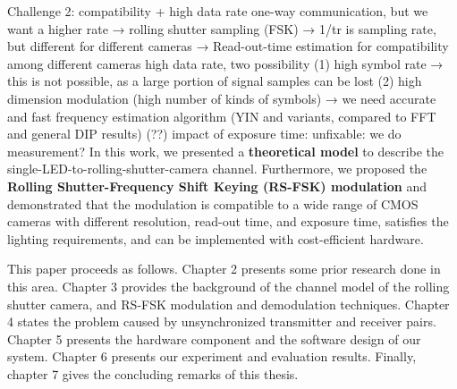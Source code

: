 Challenge 2:  compatibility + high data rate
one-way communication, but we want a higher rate → rolling shutter sampling (FSK) → 1/tr is sampling rate, but different for different cameras → Read-out-time estimation for compatibility among different cameras
high data rate, two possibility (1) high symbol rate → this is not possible, as a large portion of signal samples can be lost (2) high dimension modulation (high number of kinds of symbols) → we need accurate and fast frequency estimation algorithm (YIN and variants, compared to FFT and general DIP results)
(??) impact of exposure time: unfixable: we do measurement? 
In this work, we presented a \textbf{theoretical model} to describe the single-LED-to-rolling-shutter-camera channel. Furthermore, we proposed the \textbf{Rolling Shutter-Frequency Shift Keying (RS-FSK) modulation} and demonstrated that the modulation is compatible to a wide range of CMOS cameras with different resolution, read-out time, and exposure time, satisfies the lighting requirements, and can be implemented with cost-efficient hardware. 

This paper proceeds as follows.
Chapter 2 presents some prior research done in this area.
Chapter 3 provides the background of the channel model of the rolling shutter camera, and RS-FSK modulation and demodulation techniques.
Chapter 4 states the problem caused by unsynchronized transmitter and receiver pairs.
Chapter 5 presents the hardware component and the software design of our system.
Chapter 6 presents our experiment and evaluation results. 
Finally, chapter 7 gives the concluding remarks of this thesis. 



